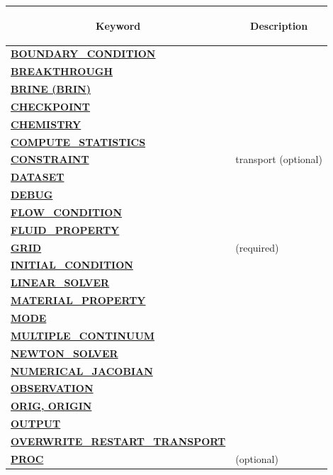 \documentclass[12pt]{article}
\begin{document}
\begin{longtable}{ll}%


\toprule[1.5pt]
\multicolumn{1}{c}{\hypertarget{target_key}{\bf Keyword}} & \multicolumn{1}{c}{\bf Description}\\
\midrule[1pt]
\hyperlink{target_bcon}{\bf BOUNDARY\_CONDITION} & \\
\hyperlink{target_brk}{\bf BREAKTHROUGH} & \\
\hyperlink{target_brine}{\bf BRINE (BRIN)} & \\
\hyperlink{target_ckpt}{\bf CHECKPOINT} & \\
\hyperlink{target_chem}{\bf CHEMISTRY} & \\
\hyperlink{target_stat}{\bf COMPUTE\_STATISTICS} & \\
\hyperlink{target_constraint}{\bf CONSTRAINT} & transport (optional)\\
\hyperlink{target_datset}{\bf DATASET} & \\
\hyperlink{target_dbg}{\bf DEBUG} & \\
\hyperlink{target_flow_cond}{\bf FLOW\_CONDITION} & \\
\hyperlink{target_fluid_property}{\bf FLUID\_PROPERTY} & \\
\hyperlink{target_grid}{\bf GRID} & (required)\\
\hyperlink{target_init}{\bf INITIAL\_CONDITION} & \\
\hyperlink{target_linsolv}{\bf LINEAR\_SOLVER} & \\
\hyperlink{target_mat}{\bf MATERIAL\_PROPERTY} & \\
\hyperlink{target_mode}{\bf MODE} & \\
\hyperlink{target_mc}{\bf MULTIPLE\_CONTINUUM} & \\
\hyperlink{target_newt}{\bf NEWTON\_SOLVER} & \\
\hyperlink{target_numjac}{\bf NUMERICAL\_JACOBIAN} & \\
\hyperlink{target_observation}{\bf OBSERVATION} & \\
\hyperlink{target_orig}{\bf ORIG, ORIGIN} & \\
\hyperlink{target_output}{\bf OUTPUT} & \\
\hyperlink{target_overwrite}{\bf OVERWRITE\_RESTART\_TRANSPORT} & \\
\hyperlink{target_proc}{\bf PROC} & (optional)\\

\end{longtable}
\end{document}
